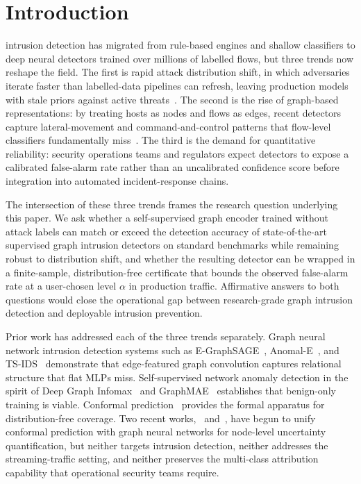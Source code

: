 \documentclass[journal,twoside]{IEEEtran}
\begin{document}
\section{Introduction}
 intrusion detection has migrated from rule-based
engines and shallow classifiers to deep neural detectors trained over
millions of labelled flows, but three trends now reshape the field. The
first is rapid attack distribution shift, in which adversaries iterate
faster than labelled-data pipelines can refresh, leaving production models
with stale priors against active threats~\cite{layeghy2023,bilot2023survey}.
The second is the rise of graph-based representations: by treating hosts as
nodes and flows as edges, recent detectors capture lateral-movement and
command-and-control patterns that flow-level classifiers fundamentally
miss~\cite{lo2022egraphsage,caville2022anomale}. The third is the demand
for quantitative reliability: security operations teams and regulators
expect detectors to expose a calibrated false-alarm rate rather than an
uncalibrated confidence score before integration into automated
incident-response chains.

The intersection of these three trends frames the research question
underlying this paper. We ask whether a self-supervised graph encoder
trained without attack labels can match or exceed the detection accuracy
of state-of-the-art supervised graph intrusion detectors on standard
benchmarks while remaining robust to distribution shift, and whether the
resulting detector can be wrapped in a finite-sample, distribution-free
certificate that bounds the observed false-alarm rate at a user-chosen
level $\alpha$ in production traffic. Affirmative answers to both
questions would close the operational gap between
research-grade graph intrusion detection and deployable
intrusion prevention.

Prior work has addressed each of the three trends separately. Graph neural
network intrusion detection systems such as E-GraphSAGE~\cite{lo2022egraphsage},
Anomal-E~\cite{caville2022anomale}, and TS-IDS~\cite{nguyen2023tsids}
demonstrate that edge-featured graph convolution captures relational
structure that flat MLPs miss. Self-supervised network anomaly detection
in the spirit of Deep Graph Infomax~\cite{velickovic2019dgi} and
GraphMAE~\cite{hou2022graphmae} establishes that benign-only training is
viable. Conformal prediction~\cite{vovk2022alrw,angelopoulos2023gentle}
provides the formal apparatus for distribution-free coverage. Two recent
works,~\cite{huang2023cfgnn} and~\cite{zargarbashi2023daps}, have begun to
unify conformal prediction with graph neural networks for node-level
uncertainty quantification, but neither targets intrusion detection, neither
addresses the streaming-traffic setting, and neither preserves the
multi-class attribution capability that operational security teams require.
\end{document}
